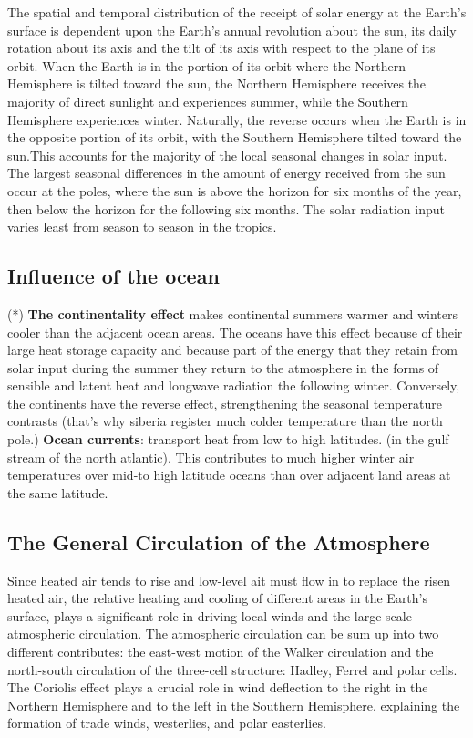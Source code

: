 The spatial and temporal distribution of the receipt of solar energy at the Earth’s surface is dependent upon
the Earth’s annual revolution about the sun, its daily rotation about its axis and the tilt of its axis with
respect to the plane of its orbit. When the Earth is in the portion of its orbit where the Northern Hemisphere
is tilted toward the sun, the Northern Hemisphere receives the majority of direct sunlight and experiences
summer, while the Southern Hemisphere experiences winter. Naturally, the reverse occurs when the Earth
is in the opposite portion of its orbit, with the Southern Hemisphere tilted toward the sun.This accounts for
the majority of the local seasonal changes in solar input. The largest seasonal differences in the amount of
energy received from the sun occur at the poles, where the sun is above the horizon for six months of the
year, then below the horizon for the following six months. The solar radiation input varies least from season
to season in the tropics.

\subsection{Influence of the ocean}(*) \textbf{The continentality effect} makes continental summers warmer and winters cooler than the adjacent ocean areas. The oceans have this effect because of their large heat storage capacity and because part of  the energy that they retain from solar input during the summer they return to the atmosphere in the forms of sensible and latent heat and longwave radiation the following winter. Conversely, the continents have the reverse effect, strengthening the seasonal temperature contrasts (that’s why siberia register much colder temperature than the north pole.)
\newline \textbf{Ocean currents}: transport heat from low to high latitudes. (in the gulf stream of the north atlantic). This contributes to much higher winter air temperatures over mid-to high latitude oceans than over adjacent land areas at the same latitude.





\subsection{The General Circulation of the Atmosphere}\label{chp:GeneralCirculation}

Since heated air tends to rise and low-level ait must flow in to replace the risen heated air, the relative heating and cooling of different areas in the Earth’s surface, plays a significant role in driving local winds and the large-scale atmospheric circulation.
The atmospheric circulation can be sum up into two different contributes: the east-west motion of the Walker circulation and the north-south circulation of the
three-cell structure: Hadley, Ferrel and polar cells. The Coriolis effect plays a crucial role in wind deflection to the right in the Northern Hemisphere and to the left in the Southern Hemisphere. explaining the formation of trade winds, westerlies, and polar easterlies.

